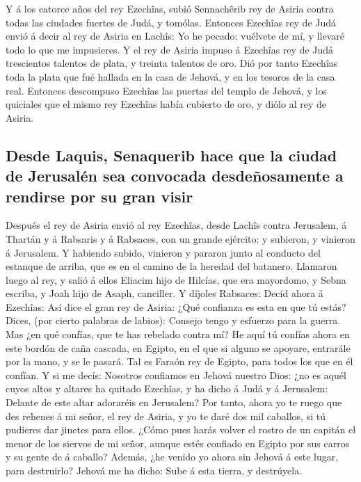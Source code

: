  Y á los catorce años del rey Ezechîas, subió Sennachêrib
rey de Asiria contra todas las ciudades fuertes de Judá, y tomólas.
 Entonces Ezechîas rey de Judá envió á decir al rey de
Asiria en Lachîs: Yo he pecado: vuélvete de mí, y llevaré todo lo que me
impusieres. Y el rey de Asiria impuso á Ezechîas rey de Judá trescientos
talentos de plata, y treinta talentos de oro.  Dió por
tanto Ezechîas toda la plata que fué hallada en la casa de Jehová, y en
los tesoros de la casa real.  Entonces descompuso Ezechîas
las puertas del templo de Jehová, y los quiciales que el mismo rey
Ezechîas había cubierto de oro, y diólo al rey de Asiria.

\hypertarget{desde-laquis-senaquerib-hace-que-la-ciudad-de-jerusaluxe9n-sea-convocada-desdeuxf1osamente-a-rendirse-por-su-gran-visir}{%
\subsection{Desde Laquis, Senaquerib hace que la ciudad de Jerusalén sea
convocada desdeñosamente a rendirse por su gran
visir}\label{desde-laquis-senaquerib-hace-que-la-ciudad-de-jerusaluxe9n-sea-convocada-desdeuxf1osamente-a-rendirse-por-su-gran-visir}}

 Después el rey de Asiria envió al rey Ezechîas, desde
Lachîs contra Jerusalem, á Thartán y á Rabsaris y á Rabsaces, con un
grande ejército: y subieron, y vinieron á Jerusalem. Y habiendo subido,
vinieron y pararon junto al conducto del estanque de arriba, que es en
el camino de la heredad del batanero.  Llamaron luego al
rey, y salió á ellos Eliacim hijo de Hilcías, que era mayordomo, y Sebna
escriba, y Joah hijo de Asaph, canciller.  Y díjoles
Rabsaces: Decid ahora á Ezechîas: Así dice el gran rey de Asiria: ¿Qué
confianza es esta en que tú estás?  Dices, (por cierto
palabras de labios): Consejo tengo y esfuerzo para la guerra. Mas ¿en
qué confías, que te has rebelado contra mí?  He aquí tú
confías ahora en este bordón de caña cascada, en Egipto, en el que si
alguno se apoyare, entrarále por la mano, y se le pasará. Tal es Faraón
rey de Egipto, para todos los que en él confían.  Y si me
decís: Nosotros confiamos en Jehová nuestro Dios: ¿no es aquél cuyos
altos y altares ha quitado Ezechîas, y ha dicho á Judá y á Jerusalem:
Delante de este altar adoraréis en Jerusalem?  Por tanto,
ahora yo te ruego que des rehenes á mi señor, el rey de Asiria, y yo te
daré dos mil caballos, si tú pudieres dar jinetes para ellos.
 ¿Cómo pues harás volver el rostro de un capitán el menor
de los siervos de mi señor, aunque estés confiado en Egipto por sus
carros y su gente de á caballo?  Además, ¿he venido yo
ahora sin Jehová á este lugar, para destruirlo? Jehová me ha dicho: Sube
á esta tierra, y destrúyela.

